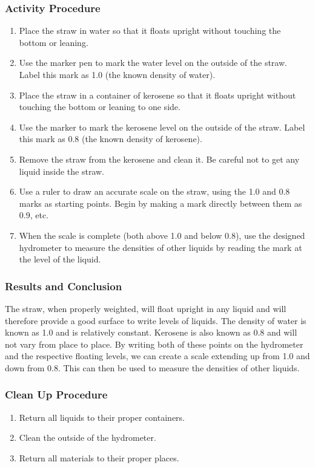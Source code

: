 \subsubsection*{Activity Procedure}
\begin{enumerate}
\item{Place the straw in water so that it floats upright without touching the bottom or leaning.} 
\item{Use the marker pen to mark the water level on the outside of the straw. Label this mark as 1.0 (the known density of water).} 
\item{Place the straw in a container of kerosene so that it floats upright without touching the bottom or leaning to one side.} 
\item{Use the marker to mark the kerosene level on the outside of the straw. Label this mark as 0.8 (the known density of kerosene).}
\item{Remove the straw from the kerosene and clean it. Be careful not to get any liquid inside the straw.} 
\item{Use a ruler to draw an accurate scale on the straw, using the 1.0 and 0.8 marks as starting points. Begin by making a mark directly between them as 0.9, etc.} 
\item{When the scale is complete (both above 1.0 and below 0.8), use the designed hydrometer to measure the densities of other liquids by reading the mark at the level of the liquid.} 
\end{enumerate}

\subsubsection*{Results and Conclusion}
The straw, when properly weighted, will float upright in any liquid and will therefore provide a good surface to write levels of liquids. The density of water is known as 1.0 and is relatively constant. Kerosene is also known as 0.8 and will not vary from place to place. By writing both of these points on the hydrometer and the respective floating levels, we can create a scale extending up from 1.0 and down from 0.8. This can then be used to measure the densities of other liquids.  

\subsubsection*{Clean Up Procedure}
\begin{enumerate}
\item{Return all liquids to their proper containers.} 
\item{Clean the outside of the hydrometer.} 
\item{Return all materials to their proper places.} 
\end{enumerate}

